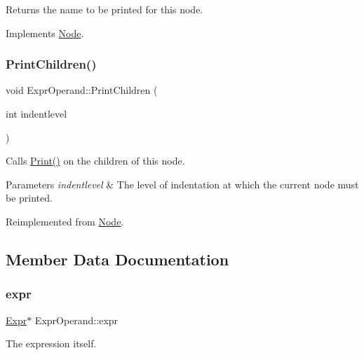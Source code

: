 Returns the name to be printed for this node. 

Implements \hyperlink{class_node_a56e29657306ffb004d69c6929ae44269}{Node}.

\mbox{\label{class_expr_operand_a45b3abc5fc95a4184179127f1aed0e94}} 
\subsubsection{\texorpdfstring{Print\+Children()}{PrintChildren()}}
{\footnotesize\ttfamily void Expr\+Operand\+::\+Print\+Children (\begin{DoxyParamCaption}\item[{int}]{indentlevel }\end{DoxyParamCaption})\hspace{0.3cm}{\ttfamily [virtual]}}

Calls \hyperlink{class_node_a9ef727fd72d1a37792b3db60a8a479dd}{Print()} on the children of this node. 
\begin{DoxyParams}{Parameters}
{\em indentlevel} & The level of indentation at which the current node must be printed. \\
\hline
\end{DoxyParams}


Reimplemented from \hyperlink{class_node_a3e67ec8d22182b721717af14fe0c3000}{Node}.



\subsection{Member Data Documentation}
\mbox{\label{class_expr_operand_a0912668446b445f8451c9c2b52a969ad}} 
\subsubsection{\texorpdfstring{expr}{expr}}
{\footnotesize\ttfamily \hyperlink{class_expr}{Expr}$\ast$ Expr\+Operand\+::expr\hspace{0.3cm}{\ttfamily [protected]}}

The expression itself. \mbox{\label{class_expr_operand_a1f69e2905035f08a4687dc3d3fc913f9}} 
